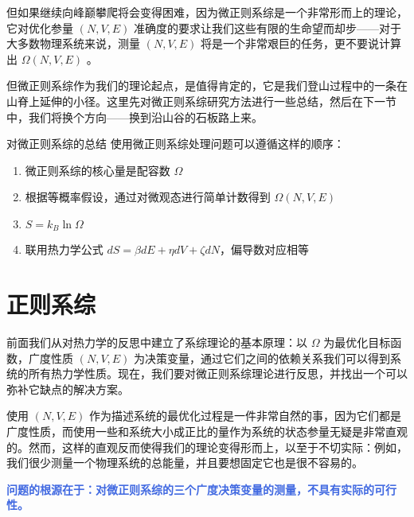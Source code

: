 \documentclass[hyperref,UTF-8]{ctexbook}
\newcommand{\0}{\boldsymbol{0}}
\begin{document}
但如果继续向峰巅攀爬将会变得困难，因为微正则系综是一个非常形而上的理论，它对优化参量 $(N,V,E)$ 准确度的要求让我们这些有限的生命望而却步——对于大多数物理系统来说，测量 $(N,V,E)$ 将是一个非常艰巨的任务，更不要说计算出 $\Omega(N,V,E)$ 。

但微正则系综作为我们的理论起点，是值得肯定的，它是我们登山过程中的一条在山脊上延伸的小径。这里先对微正则系综研究方法进行一些总结，然后在下一节中，我们将换个方向——换到沿山谷的石板路上来。

\begin{understanding}{\kaishu 对微正则系综的总结}
\kaishu \fontsize{11pt}{16pt}
\quad\quad 使用微正则系综处理问题可以遵循这样的顺序：
    \begin{enumerate}
        \item 微正则系综的核心量是配容数 $\Omega$
        \item 根据等概率假设，通过对微观态进行简单计数得到 $\Omega(N,V,E)$
        \item $S = k_B \ln \Omega$
        \item 联用热力学公式 $dS = \beta dE + \eta dV + \zeta dN$，偏导数对应相等
    \end{enumerate}

\end{understanding}

\chapter{正则系综}\label{cha:正则系综}

前面我们从对热力学的反思中建立了系综理论的基本原理：以 $\Omega$ 为最优化目标函数，广度性质 $(N,V,E)$ 为决策变量，通过它们之间的依赖关系我们可以得到系统的所有热力学性质。现在，我们要对微正则系综理论进行反思，并找出一个可以弥补它缺点的解决方案。

使用 $(N,V,E)$ 作为描述系统的最优化过程是一件非常自然的事，因为它们都是广度性质，而使用一些和系统大小成正比的量作为系统的状态参量无疑是非常直观的。然而，这样的直观反而使得我们的理论变得形而上，以至于不切实际：例如，我们很少测量一个物理系统的总能量，并且要想固定它也是很不容易的。

\textcolor{RoyalBlue}{\textbf{\kaishu 问题的根源在于：对微正则系综的三个广度决策变量的测量，不具有实际的可行性。}}  
\end{document}
